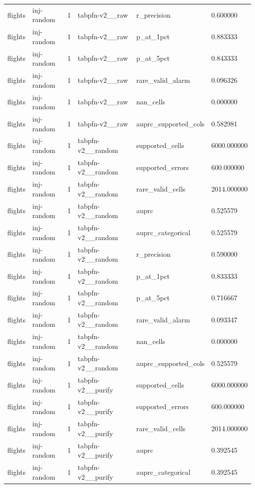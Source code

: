 \begin{tabular}{llllll}
flights & inj-random & 1 & tabpfn-v2\_\_raw & r\_precision & 0.600000 \\
flights & inj-random & 1 & tabpfn-v2\_\_raw & p\_at\_1pct & 0.883333 \\
flights & inj-random & 1 & tabpfn-v2\_\_raw & p\_at\_5pct & 0.843333 \\
flights & inj-random & 1 & tabpfn-v2\_\_raw & rare\_valid\_alarm & 0.096326 \\
flights & inj-random & 1 & tabpfn-v2\_\_raw & nan\_cells & 0.000000 \\
flights & inj-random & 1 & tabpfn-v2\_\_raw & auprc\_supported\_cols & 0.582981 \\
flights & inj-random & 1 & tabpfn-v2\_\_random & supported\_cells & 6000.000000 \\
flights & inj-random & 1 & tabpfn-v2\_\_random & supported\_errors & 600.000000 \\
flights & inj-random & 1 & tabpfn-v2\_\_random & rare\_valid\_cells & 2014.000000 \\
flights & inj-random & 1 & tabpfn-v2\_\_random & auprc & 0.525579 \\
flights & inj-random & 1 & tabpfn-v2\_\_random & auprc\_categorical & 0.525579 \\
flights & inj-random & 1 & tabpfn-v2\_\_random & r\_precision & 0.590000 \\
flights & inj-random & 1 & tabpfn-v2\_\_random & p\_at\_1pct & 0.833333 \\
flights & inj-random & 1 & tabpfn-v2\_\_random & p\_at\_5pct & 0.716667 \\
flights & inj-random & 1 & tabpfn-v2\_\_random & rare\_valid\_alarm & 0.093347 \\
flights & inj-random & 1 & tabpfn-v2\_\_random & nan\_cells & 0.000000 \\
flights & inj-random & 1 & tabpfn-v2\_\_random & auprc\_supported\_cols & 0.525579 \\
flights & inj-random & 1 & tabpfn-v2\_\_purify & supported\_cells & 6000.000000 \\
flights & inj-random & 1 & tabpfn-v2\_\_purify & supported\_errors & 600.000000 \\
flights & inj-random & 1 & tabpfn-v2\_\_purify & rare\_valid\_cells & 2014.000000 \\
flights & inj-random & 1 & tabpfn-v2\_\_purify & auprc & 0.392545 \\
flights & inj-random & 1 & tabpfn-v2\_\_purify & auprc\_categorical & 0.392545 \\

\end{tabular}
